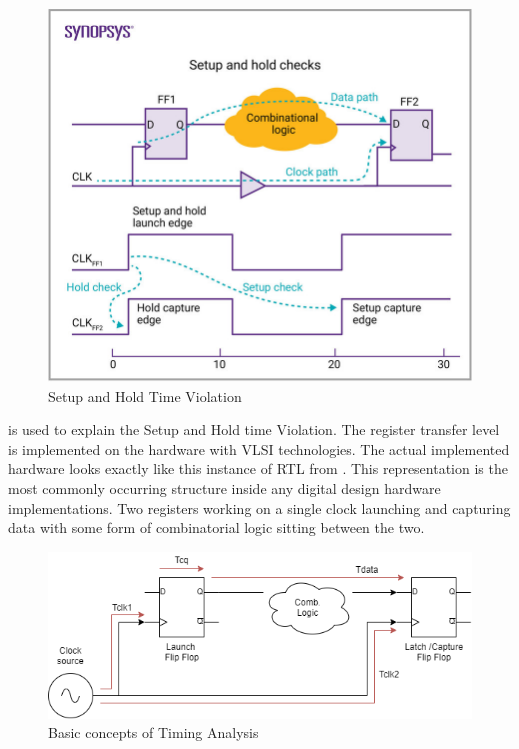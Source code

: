 \begin{figure}[H]
\begin{center}
\includegraphics[width=4.5in]{images/STASetupHoldViolation.jpg}
\caption{Setup and Hold Time Violation}
\label{STASetupHoldViolation}
\end{center}
\end{figure}

 is used to explain the Setup and Hold time Violation. The register transfer level is implemented on the hardware with VLSI technologies. The actual implemented hardware looks exactly like this instance of RTL from . This representation is the most commonly occurring structure inside any digital design hardware implementations. Two registers working on a single clock launching and capturing data with some form of combinatorial logic sitting between the two.

\begin{figure}[H]
\begin{center}
\includegraphics[width=\textwidth]{images/TimingFF.png}
\caption{Basic concepts of Timing Analysis}
\label{TimingFF}
\end{center}
\end{figure}

